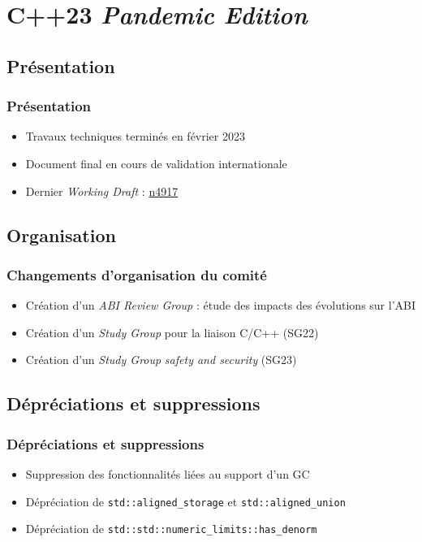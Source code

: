 \documentclass[C++.tex]{subfiles}
\begin{document}
\section{C++23 \og{}\textit{Pandemic Edition}\fg{}}
\subsection*{Présentation}
\begin{frame}
	\frametitle{Présentation}
	\begin{itemize}
		\item Travaux techniques terminés en février 2023
		\item Document final en cours de validation internationale
		\item Dernier \textit{Working Draft} : \href{https://github.com/cplusplus/draft/releases/download/n4917/n4917.pdf}{n4917}
	\end{itemize}
\end{frame}

\subsection*{Organisation}
\begin{frame}
	\frametitle{Changements d'organisation du comité}
	\begin{itemize}
		\item Création d'un \textit{ABI Review Group} : étude des impacts des évolutions sur l'ABI
		\item Création d'un \textit{Study Group} pour la liaison C/C++ (SG22)
		\item Création d'un \textit{Study Group} \textit{safety and security} (SG23)
	\end{itemize}
\end{frame}

\subsection*{Dépréciations et suppressions}
\begin{frame}[fragile]
	\frametitle{Dépréciations et suppressions}
	\begin{itemize}
		\item Suppression des fonctionnalités liées au support d'un GC


		\item Dépréciation de \lstinline|std::aligned_storage| et \lstinline|std::aligned_union|
		\item Dépréciation de \lstinline|std::std::numeric_limits::has_denorm|
	\end{itemize}
\end{frame}
\end{document}
